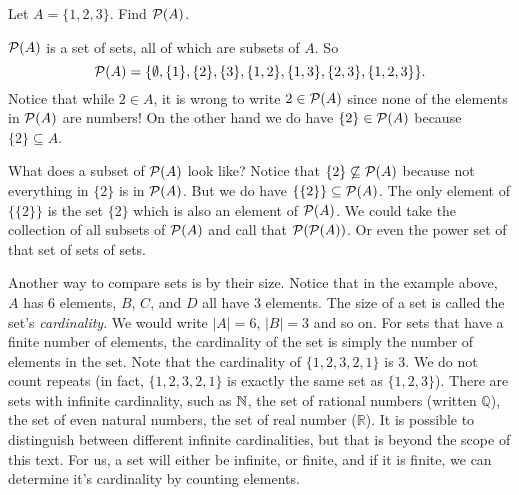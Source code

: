\documentclass[12pt]{article}
\begin{document}
\begin{example}
  Let $A = \{1,2,3\}$.  Find $\mathcal P(A)$.
  \begin{solution}
    $\mathcal P(A)$ is a set of sets, all of which are subsets of $A$.  So
    \[\mathcal P(A) = \{ \emptyset, \{1\}, \{2\}, \{3\}, \{1,2\}, \{1, 3\}, \{2,3\}, \{1,2,3\}\}.\]
    Notice that while $2 \in A$, it is wrong to write $2 \in \mathcal P(A)$ since none of the elements in $\mathcal P(A)$ are numbers!  On the other hand we do have $\{2\} \in \mathcal P(A)$ because $\{2\} \subseteq A$.

    What does a subset of $\mathcal P(A)$ look like?  Notice that $\{2\} \not\subseteq \mathcal P(A)$ because not everything in $\{2\}$ is in $\mathcal P(A)$.  But we do have $\{ \{2\} \} \subseteq \mathcal P(A)$.  The only element of $\{\{2\}\}$ is the set $\{2\}$ which is also an element of $\mathcal P(A)$.  We could take the collection of all subsets of $\mathcal P(A)$ and call that $\mathcal P(\mathcal P(A))$.  Or even the power set of that set of sets of sets.
  \end{solution}

\end{example}


Another way to compare sets is by their size.  Notice that in the example above, $A$ has 6 elements, $B$, $C$, and $D$ all have 3 elements.  The size of a set is called the set's \emph{cardinality}.  We would write $|A| = 6$, $|B| = 3$ and so on.  For sets that have a finite number of elements, the cardinality of the set is simply the number of elements in the set.  Note that the cardinality of $\{ 1, 2, 3, 2, 1\}$ is 3. We do not count repeats (in fact, $\{1, 2, 3, 2, 1\}$ is exactly the same set as $\{1, 2, 3\}$).  There are sets with infinite cardinality, such as $\mathbb N$, the set of rational numbers (written $\mathbb Q$), the set of even natural numbers, the set of real number ($\mathbb R$).  It is possible to distinguish between different infinite cardinalities, but that is beyond the scope of this text.  For us, a set will either be infinite, or finite, and if it is finite, we can determine it's cardinality by counting elements.
\end{document}
